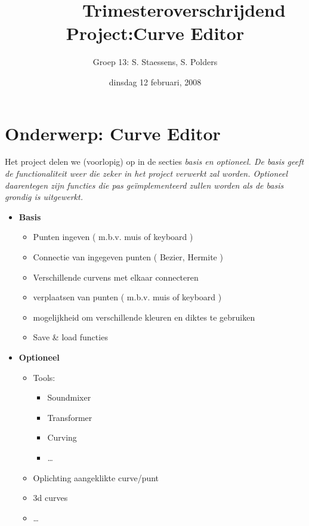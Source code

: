 \documentclass[a4paper,11pt,oneside, titlepage]{article}
\author{ Groep 13: S. Staessens, S. Polders }
\title{\ \ \ \ \ \ Trimesteroverschrijdend Project:\newline Curve Editor}
\date{dinsdag 12 februari, 2008}
\begin{document}
\maketitle\newpage
\section{Onderwerp: Curve Editor}
Het project delen we (voorlopig) op in de secties \it{basis} en \it{optioneel}. 
\rm{De basis geeft de functionaliteit weer die zeker in het project verwerkt zal worden. Optioneel
daarentegen zijn functies die pas ge\"implementeerd zullen worden als de basis grondig is 
uitgewerkt.}
\begin{itemize}
\item \bf{Basis}
\begin{itemize}
\item \rm{Punten ingeven ( m.b.v. muis of keyboard )}
\item Connectie van ingegeven punten ( Bezier, Hermite )
\item Verschillende curvens met elkaar connecteren
\item verplaatsen van punten ( m.b.v. muis of keyboard )
\item mogelijkheid om verschillende kleuren en diktes te gebruiken
\item Save \& load functies
\end{itemize}
\item \bf{Optioneel}
\begin{itemize}
\item \rm{Tools:}
\begin{itemize}
\item Soundmixer
\item Transformer
\item Curving
\item \ldots
\end{itemize}
\item Oplichting aangeklikte curve/punt
\item 3d curves
\item \ldots
\end{itemize}
\end{itemize}
\end{document}

